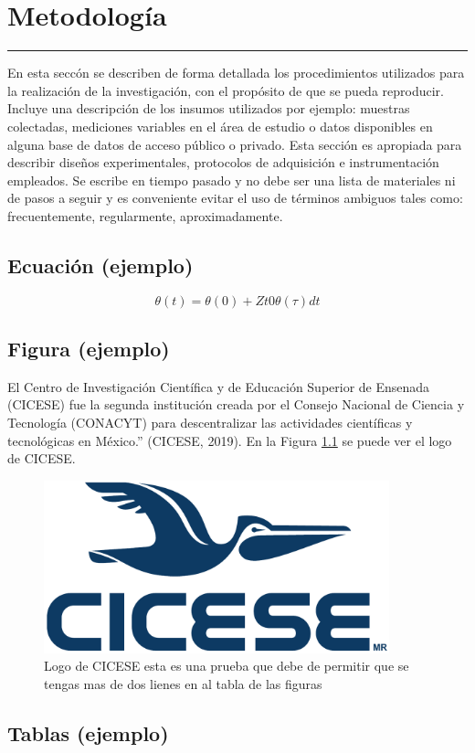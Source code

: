 \chapter{Metodolog\'ia}\label{capit:cap2}
\vspace{-2.0325ex}%
\noindent
\rule{\textwidth}{0.5pt}
\vspace{-5.5ex}%
\newcommand{\pushline}{\Indp}%


En esta secc\'on se describen de forma detallada los procedimientos utilizados para la realizaci\'on de la investigaci\'on, con el propósito de que se pueda reproducir. Incluye una descripci\'on de los insumos utilizados por ejemplo: muestras colectadas, mediciones variables en el \'area de estudio o datos disponibles en alguna base de datos de acceso p\'ublico o privado. Esta secci\'on es apropiada para describir diseños experimentales, protocolos de adquisici\'on e instrumentaci\'on empleados. Se escribe en tiempo pasado y no debe ser una lista de materiales ni de pasos a seguir y es conveniente evitar el uso de t\'erminos ambiguos tales como: frecuentemente, regularmente, aproximadamente.
\\

\section{Ecuaci\'on (ejemplo)}\label{secc:ejemploec}

\begin{equation}
\theta(t) = \theta(0) + Zt0 \theta(\tau)dt
\label{eq:ejem}
\end{equation}

\section{Figura (ejemplo)}\label{secc:ejemplofig}

El Centro de Investigación Científica y de Educación Superior de Ensenada (CICESE) fue la segunda institución creada por el Consejo Nacional de Ciencia y Tecnología (CONACYT) para descentralizar las actividades científicas y tecnológicas en México.” (CICESE, 2019). En la Figura \ref{fig:ejemplo1} se puede ver el logo de CICESE. 


\begin{figure}[h]
        \centering
        \includegraphics[width=100mm]{./figuras/logoCicese2009.pdf}
        \caption{Logo de CICESE esta es una prueba que debe de permitir que se tengas mas de dos lienes en al tabla de las figuras} 
				\label{fig:ejemplo1}
\end{figure}

\section{Tablas (ejemplo)}\label{secc:ejemplotab}

		

\newpage
